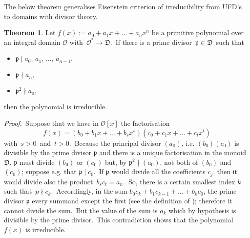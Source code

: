 \documentclass[12pt]{article}
\theoremstyle{definition}
\begin{document}
 
The below theorem generalises Eisenstein criterion of irreducibility from UFD's to domains with divisor theory.\\

\newtheorem*{thm}{Theorem}
\begin{thm}
Let\; $f(x) := a_0\!+\!a_1x\!+\ldots+\!a_nx^n$\; be a primitive polynomial over an integral domain $\mathcal{O}$ with  \,$\mathcal{O}^* \to \mathfrak{D}$.\, If there is a prime divisor\, $\mathfrak{p \in D}$\, such that
\begin{itemize}
\item $\mathfrak{p} \mid a_0,\,a_1,\,\ldots,\,a_{n-1},$
\item $\mathfrak{p} \nmid a_n,$
\item $\mathfrak{p}^2 \nmid a_0,$
\end{itemize}
then the polynomial is irreducible.\\
\end{thm}

{\em Proof.}\,
Suppose that we have in $\mathcal{O}[x]$ the factorisation
$$f(x) = (b_0+b_1x+\ldots+b_sx^s)(c_0+c_1x+\ldots+c_tx^t)$$
with\, $s > 0$\, and\, $t > 0$.\, Because the principal divisor $(a_0)$, i.e. $(b_0)(c_0)$ is divisible by the prime divisor $\mathfrak{p}$ and there is a unique factorisation in the monoid $\mathfrak{D}$, $\mathfrak{p}$ must divide $(b_0)$ or $(c_0)$ but, by $\mathfrak{p}^2 \nmid (a_0)$, not both of $(b_0)$ and $(c_0)$; suppose e.g. that 
$\mathfrak{p} \mid c_0$.\, If $\mathfrak{p}$ would divide all the coefficients $c_j$, then it would divide also the product \,$b_sc_t = a_n$.\, So, there is a certain smallest index $k$ such that\, $p \nmid c_k$.\, Accordingly, in the sum $b_0c_k+b_1c_{k-1}+\ldots+b_kc_0$, the prime divisor $\mathfrak{p}$  every summand except the first (see the definition of ); therefore it cannot divide the sum.\, But the value of the sum is $a_k$ which by hypothesis is divisible by the prime divisor.\, This contradiction shows that the polynomial $f(x)$ is irreducible.
\end{document}
